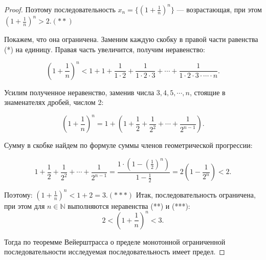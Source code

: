 \documentclass[a4paper,12pt]{article}
\begin{document}
\begin{proof}
            Поэтому последовательность ${x_n} =  \{ (1+\frac{1}{n})^{n}\}$  — возрастающая, при этом $(1+\frac{1}{n})^{n}>2. (**)$

            Покажем, что она ограничена. Заменим каждую скобку в правой части равенства (*) на единицу. Правая часть увеличится, получим неравенство:

            $$(1+\frac{1}{n})^{n}<1+1+\frac{1}{1\cdot 2}+\frac{1}{1\cdot 2\cdot 3}+ \cdots +\frac{1}{1\cdot 2\cdot 3\cdot \cdots \cdot n}.$$

            Усилим полученное неравенство, заменив числа $3, 4, 5, \cdots, n $, стоящие в знаменателях дробей, числом 2:

            $$(1+\frac{1}{n})^{n} = 1+ (1+\frac{1}{2}+\frac{1}{2^2}+\cdots +\frac{1}{2^{n-1}}).$$

            Сумму в скобке найдем по формуле суммы членов геометрической прогрессии:

            $$1+\frac{1}{2}+\frac{1}{2^2}+ \cdots +\frac{1}{2^{n-1}} = \frac{1\cdot (1- (\frac{1}{2})^n)}{1-\frac{1}{2}}= 2 (1-\frac{1}{2^n})<2.$$

            Поэтому: $(1+\frac{1}{n})^{n}<1+2= 3. (***)$
            Итак, последовательность ограничена, при этом для $n \in \mathbb{N}$ выполняются неравенства (**) и (***):
            $$2 < (1+\frac{1}{n})^{n}<3.$$

            Тогда по теоремме Вейерштрасса о пределе монотонной ограниченной последовательности исследуемая последовательность имеет предел.
    \end{proof}
\end{document}
